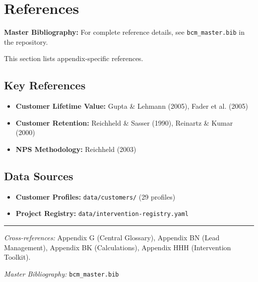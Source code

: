 \section{References}
\label{sec:bp-references}

\begin{tcolorbox}[colback=blue!5!white, colframe=blue!75!black]
\textbf{Master Bibliography:} For complete reference details, see
\texttt{bcm\_master.bib} in the repository.

This section lists appendix-specific references.
\end{tcolorbox}

\subsection{Key References}

\begin{itemize}[nosep]
\item \textbf{Customer Lifetime Value:} Gupta \& Lehmann (2005), Fader et al. (2005)
\item \textbf{Customer Retention:} Reichheld \& Sasser (1990), Reinartz \& Kumar (2000)
\item \textbf{NPS Methodology:} Reichheld (2003)
\end{itemize}

\subsection{Data Sources}

\begin{itemize}[nosep]
\item \textbf{Customer Profiles:} \texttt{data/customers/} (29 profiles)
\item \textbf{Project Registry:} \texttt{data/intervention-registry.yaml}
\end{itemize}



\vspace{1em}
\hrule
\vspace{0.5em}

\noindent\textit{Cross-references:}
Appendix G (Central Glossary),
Appendix BN (Lead Management),
Appendix BK (Calculations),
Appendix HHH (Intervention Toolkit).

\noindent\textit{Master Bibliography:} \texttt{bcm\_master.bib}

